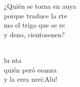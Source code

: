\begin{cancion}
	¿Quién se torna en auya\\
	porque traduce la rte\\
	mo el trigo que se re \\
	y deno, cientosenen?\\\jump\\
	\begin{chorus}%
	lu nta \\
	quién peró esanza\\
	y la erra nrei:Alu!\\
	\end{chorus}%
	\jump\\
\end{cancion}%
